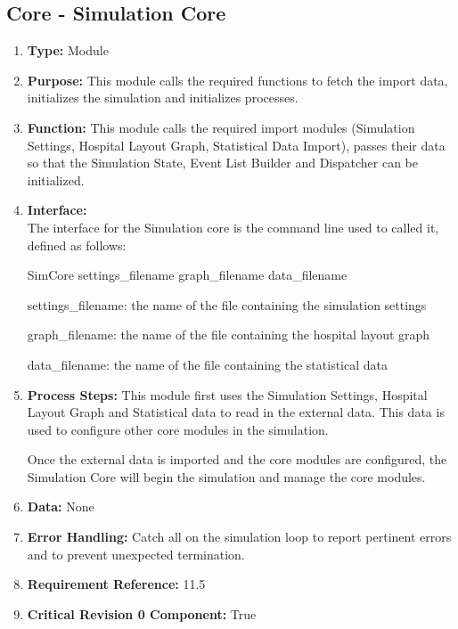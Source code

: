 \documentclass[paper=letter, fontsize=10pt]{scrartcl}
\numberwithin{equation}{section}		%
\numberwithin{figure}{section}			%
\numberwithin{table}{section}				%
\begin{document}
\subsection{Core - Simulation Core}
\begin{enumerate}[]
	\item \textbf{Type:} Module
	\item \textbf{Purpose:} This module calls the required functions to fetch the import data, initializes the simulation and initializes processes.
	\item \textbf{Function:} This module calls the required import modules (Simulation Settings, Hospital Layout Graph, Statistical Data Import), passes their data so that the Simulation State, Event List Builder and Dispatcher can be initialized.
	\item \textbf{Interface:}\\ 
	The interface for the Simulation core is the command line used to called it, defined as follows:
	
	SimCore settings\_filename graph\_filename data\_filename
	
	settings\_filename: the name of the file containing the simulation settings
	
	graph\_filename: the name of the file containing the hospital layout graph
	
	data\_filename: the name of the file containing the statistical data
	
	\item \textbf{Process Steps:} This module first uses the Simulation Settings, Hospital Layout Graph and Statistical data to read in the external data.  This data is used to configure other core modules in the simulation.
	
	Once the external data is imported and the core modules are configured, the Simulation Core will begin the simulation and manage the core modules.
	\item \textbf{Data:} None
	\item \textbf{Error Handling:} Catch all on the simulation loop to report pertinent errors and to prevent unexpected termination. 
	\item \textbf{Requirement Reference:} 11.5
	\item \textbf{Critical Revision 0 Component:} True
\end{enumerate}
\end{document}
